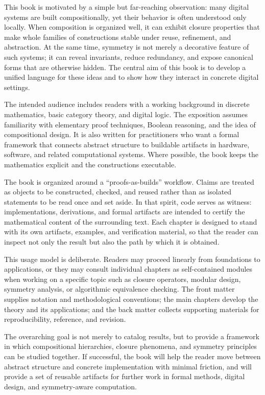 This book is motivated by a simple but far-reaching observation: many digital systems are built compositionally, yet their behavior is often understood only locally. When composition is organized well, it can exhibit closure properties that make whole families of constructions stable under reuse, refinement, and abstraction. At the same time, symmetry is not merely a decorative feature of such systems; it can reveal invariants, reduce redundancy, and expose canonical forms that are otherwise hidden. The central aim of this book is to develop a unified language for these ideas and to show how they interact in concrete digital settings.

The intended audience includes readers with a working background in discrete mathematics, basic category theory, and digital logic. The exposition assumes familiarity with elementary proof techniques, Boolean reasoning, and the idea of compositional design. It is also written for practitioners who want a formal framework that connects abstract structure to buildable artifacts in hardware, software, and related computational systems. Where possible, the book keeps the mathematics explicit and the constructions executable.

The book is organized around a ``proofs-as-builds'' workflow. Claims are treated as objects to be constructed, checked, and reused rather than as isolated statements to be read once and set aside. In that spirit, code serves as witness: implementations, derivations, and formal artifacts are intended to certify the mathematical content of the surrounding text. Each chapter is designed to stand with its own artifacts, examples, and verification material, so that the reader can inspect not only the result but also the path by which it is obtained.

This usage model is deliberate. Readers may proceed linearly from foundations to applications, or they may consult individual chapters as self-contained modules when working on a specific topic such as closure operators, modular design, symmetry analysis, or algorithmic equivalence checking. The front matter supplies notation and methodological conventions; the main chapters develop the theory and its applications; and the back matter collects supporting materials for reproducibility, reference, and revision.

The overarching goal is not merely to catalog results, but to provide a framework in which compositional hierarchies, closure phenomena, and symmetry principles can be studied together. If successful, the book will help the reader move between abstract structure and concrete implementation with minimal friction, and will provide a set of reusable artifacts for further work in formal methods, digital design, and symmetry-aware computation.

